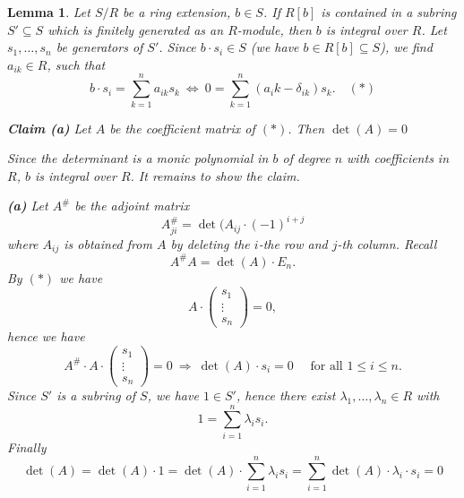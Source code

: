\documentclass[11pt]{book}
\newtheorem{lemma}[theorem]{Lemma}
\theoremstyle{nonumberbreak}
\newenvironment{pr}[1][]{\ifthenelse{\equal{#1}{}}{\proof}{\proof[#1]}\rm}{\endproof}
\begin{document}
\begin{spacing}{1.3}
\begin{lemma} %
Let $S/R$ be a ring extension, $b \in S$. If $R[b]$ is contained in a subring $S' \subseteq S$ which is finitely generated as an $R$-module, then $b$ is integral over $R$.
\begin{pr}
Let $s_1, \ldots, s_n$ be generators of $S'$. Since $b \cdot s_i \in S$ (we have $b \in R[b] \subseteq S$), we find $a_{ik} \in R$, such that 
$$b\cdot s_i = \sum_{k=1}^n a_{ik} s_k \ \Longleftrightarrow \ 0=\sum_{k=1}^n (a_ik-\delta_{ik})s_k .\quad (*)$$
\begin{compactenum}
\item[\textbf{Claim (a)}] Let $A$ be the coefficient matrix of $(*)$. Then $\det(A)=0$
\end{compactenum}
Since the determinant is a monic polynomial in $b$ of degree $n$ with coefficients in $R$, $b$ is integral over $R$. It remains to show the claim.
\begin{compactenum}
\item[\textbf{(a)}] Let $A^{\#}$ be the adjoint matrix
$$A_{ji}^{\#}=\det(A_{ij} \cdot (-1)^{i+j}$$
where $A_{ij}$ is obtained from $A$ by deleting the $i$-the row and $j$-th column. Recall
$$A^{\#} A = \det(A) \cdot E_n.$$
By $(*)$ we have
$$A \cdot \begin{pmatrix}s_1 \\ \vdots \\ s_n \end{pmatrix} =0,$$
hence we have
$$A^{\#}\cdot A \cdot \begin{pmatrix}s_1 \\ \vdots \\ s_n \end{pmatrix} =0 \ \Longrightarrow \ \det(A) \cdot s_i = 0 \quad \textrm{ for all } 1 \leqslant i \leqslant n.$$
Since $S'$ is a subring of $S$, we have $1\in S'$, hence there exist $\lambda_1, \ldots, \lambda_n \in R$ with
$$1 = \sum_{i=1}^n \lambda_i s_i.$$
Finally
$$\det(A)=\det(A) \cdot 1 = \det(A)\cdot \sum_{i=1}^n \lambda_i s_i = \sum_{i=1}^n \det(A) \cdot \lambda_i \cdot s_i = 0$$
\end{compactenum}
\end{pr}
\end{lemma}



\end{spacing}
\end{document}
